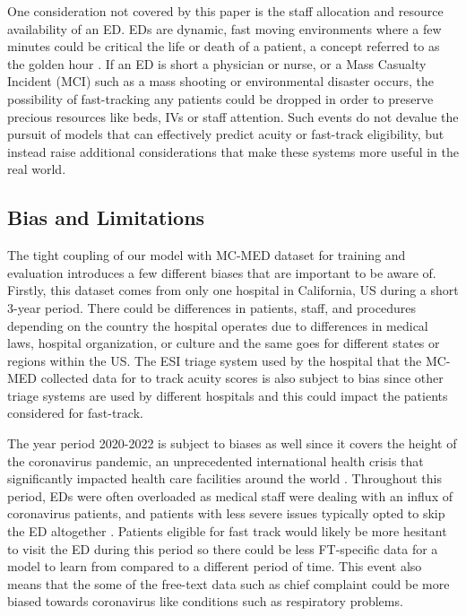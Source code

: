 \documentclass[sigconf]{acmart}
\begin{document}
One consideration not covered by this paper is the staff allocation and resource availability of an ED. EDs are dynamic, fast moving environments where a few minutes could be critical the life or death of a patient, a concept referred to as the golden hour \cite{acs2018atls}. If an ED is short a physician or nurse, or a Mass Casualty Incident (MCI) such as a mass shooting or environmental disaster occurs, the possibility of fast-tracking any patients could be dropped in order to preserve precious resources like beds, IVs or staff attention. Such events do not devalue the pursuit of models that can effectively predict acuity or fast-track eligibility, but instead raise additional considerations that make these systems more useful in the real world.
\subsection{Bias and Limitations}
The tight coupling of our model with MC-MED dataset for training and evaluation introduces a few different biases that are important to be aware of. Firstly, this dataset comes from only one hospital in California, US during a short 3-year period. There could be differences in patients, staff, and procedures depending on the country the hospital operates due to differences in medical laws, hospital organization, or culture and the same goes for different states or regions within the US. The ESI triage system used by the hospital that the MC-MED collected data for to track acuity scores is also subject to bias since other triage systems are used by different hospitals and this could impact the patients considered for fast-track.

The year period 2020-2022 is subject to biases as well since it covers the height of the coronavirus pandemic, an unprecedented international health crisis that significantly impacted health care facilities around the world \cite{naturemed2021covid}. Throughout this period, EDs were often overloaded as medical staff were dealing with an influx of coronavirus patients, and patients with less severe issues typically opted to skip the ED altogether \cite{muselli2022impact}. Patients eligible for fast track would likely be more hesitant to visit the ED during this period so there could be less FT-specific data for a model to learn from compared to a different period of time. This event also means that the some of the free-text data such as chief complaint could be more biased towards coronavirus like conditions such as respiratory problems.
\end{document}
